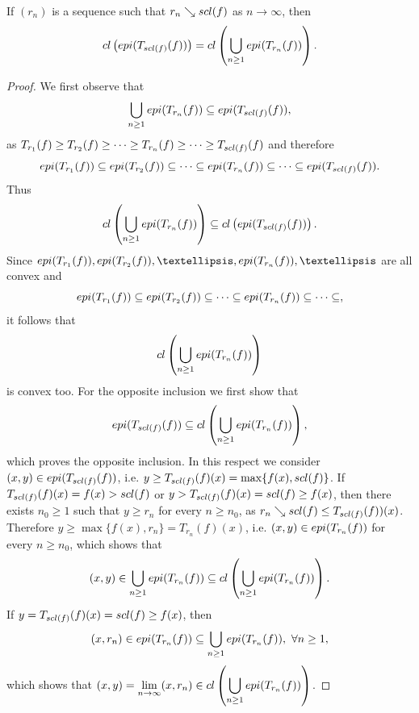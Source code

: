 \documentclass[10pt,a4paper]{amsart}
\begin{document}
\begin{lemma}
If $(r_n)$ is a sequence such that $r_n\searrow {\rm scl}(f)$ as $n\longrightarrow\infty$, then 
\begin{equation}
{\rm cl}\left({\rm epi}(T_{{\rm scl}(f)}(f))\right)={\rm cl}\left(\displaystyle\bigcup_{n\geq 1}{\rm epi}(T_{r_n}(f))\right).
\end{equation}
\end{lemma}

\begin{proof}
We first observe that 
\[
\displaystyle\bigcup_{n\geq 1}{\rm epi}(T_{r_n}(f))\subseteq {\rm epi}(T_{{\rm scl}(f)}(f)), 
\]
as $T_{r_1}(f)\geq T_{r_2}(f)\geq \cdots\geq T_{r_n}(f)\geq \cdots\geq T_{{\rm scl}(f)}(f)$ and
therefore
\begin{equation}\label{asofepi}
{\rm epi}(T_{r_1}(f))\subseteq  {\rm epi}(T_{r_2}(f))\subseteq\cdots\subseteq  {\rm epi}(T_{r_n}(f))\subseteq \cdots\subseteq {\rm epi}(T_{{\rm scl}(f)}(f)).
\end{equation}
Thus
\begin{equation}\label{inclofclepi}
{\rm cl}\left(\displaystyle\bigcup_{n\geq 1}{\rm epi}(T_{r_n}(f))\right)\subseteq {\rm cl}\left({\rm epi}(T_{{\rm scl}(f)}(f))\right).
\end{equation}
Since  ${\rm epi}(T_{r_1}(f)),  {\rm epi}(T_{r_2}(f)),\ldots,  {\rm epi}(T_{r_n}(f)), \ldots$ are all convex and 
\[
{\rm epi}(T_{r_1}(f))\subseteq  {\rm epi}(T_{r_2}(f))\subseteq\cdots\subseteq  {\rm epi}(T_{r_n}(f))\subseteq \cdots\subseteq,   
\]
it follows that 
\[{\rm cl}\left(\displaystyle\bigcup_{n\geq 1}{\rm epi}(T_{r_n}(f))\right)\] is convex too. For the opposite inclusion we first show that
\begin{equation}\label{inclofclepi-1}
{\rm epi}(T_{{\rm scl}(f)}(f))\subseteq{\rm cl}\left(\displaystyle\bigcup_{n\geq 1}{\rm epi}(T_{r_n}(f))\right),
\end{equation}
which proves the opposite inclusion. In this respect we consider $(x,y)\in {\rm epi}(T_{{\rm scl}(f)}(f))$, i.e. 
$y\geq T_{{\rm scl}(f)}(f)(x)=\max\{f(x),{\rm scl}(f)\}$. If $T_{{\rm scl}(f)}(f)(x)=f(x)>{\rm scl}(f)$ or $y>T_{{\rm scl}(f)}(f)(x)={\rm scl}(f)\geq f(x)$,
then there exists $n_0\geq 1$ such that $y\geq r_n$ for every $n\geq n_0$, as $r_n\searrow {\rm scl}(f)\leq T_{{\rm scl}(f)}(f))(x)$.
Therefore $y\geq\max\{f(x),r_n\}=T_{r_n}(f)(x)$, i.e. $(x,y)\in {\rm epi}(T_{r_n}(f))$ for every $n\geq n_0$, which shows that 
\[(x,y)\in\displaystyle\bigcup_{n\geq 1}{\rm epi}(T_{r_n}(f))\subseteq {\rm cl}\left(\displaystyle\bigcup_{n\geq 1}{\rm epi}(T_{r_n}(f))\right).\]
If $y=T_{{\rm scl}(f)}(f)(x)={\rm scl}(f)\geq f(x)$, then 
\[
(x,r_n)\in {\rm epi}(T_{r_n}(f))\subseteq  \displaystyle\bigcup_{n\geq 1}{\rm epi}(T_{r_n}(f)), \ \forall n\geq 1,
\]
which shows that $(x,y)=\displaystyle\lim_{n\rightarrow\infty}(x,r_n)\in {\rm cl}\left(\displaystyle\bigcup_{n\geq 1}{\rm epi}(T_{r_n}(f))\right)$.
\end{proof}
\end{document}
